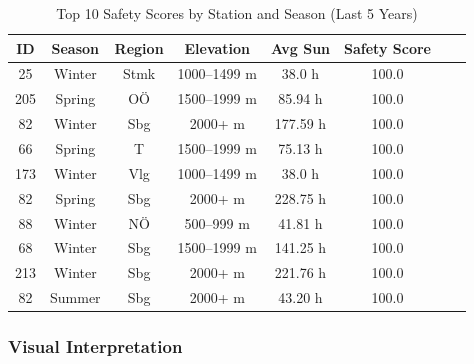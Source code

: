 \begin{table}[H]
    \centering
    \begin{tabular}{|c|c|c|c|c|c|c|c|}
        \hline
        \textbf{ID} & \textbf{Season} & \textbf{Region} & \textbf{Elevation} & \textbf{Avg Sun} & \textbf{Safety Score}         \\
        \hline
        25          & Winter          & Stmk            & 1000–1499 m        & 38.0 h                                             & 100.0 \\
        205         & Spring          & OÖ              & 1500–1999 m        & 85.94 h                                            & 100.0 \\
        82          & Winter          & Sbg             & 2000+ m            & 177.59 h                                           & 100.0 \\
        66          & Spring          & T               & 1500–1999 m        & 75.13 h                                            & 100.0 \\
        173         & Winter          & Vlg             & 1000–1499 m        & 38.0 h                                             & 100.0 \\
        82          & Spring          & Sbg             & 2000+ m            & 228.75 h                                           & 100.0 \\
        88          & Winter          & NÖ              & 500–999 m          & 41.81 h                                            & 100.0 \\
        68          & Winter          & Sbg             & 1500–1999 m        & 141.25 h                                           & 100.0 \\
        213         & Winter          & Sbg             & 2000+ m            & 221.76 h                                           & 100.0 \\
        82          & Summer          & Sbg             & 2000+ m            & 43.20 h                                            & 100.0 \\
        \hline
    \end{tabular}
    \caption{Top 10 Safety Scores by Station and Season (Last 5 Years)}
    \label{tab:top_scores}
\end{table}

\subsubsection{Visual Interpretation}


